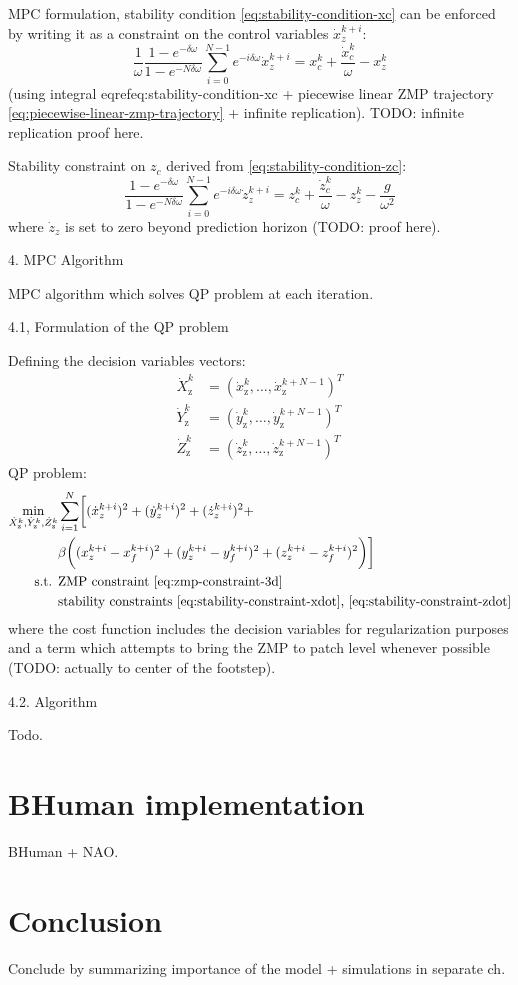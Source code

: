 MPC formulation, stability condition \eqref{eq:stability-condition-xc} can be 
enforced by writing it as a constraint on the control variables
$\dot{x}_z^{k+i}$:
\begin{equation}
  \label{eq:stability-constraint-xdot}
  \frac{1}{\omega}\frac{1-e^{-\delta\omega}}{1-e^{-N\delta\omega}}
    \sum_{i=0}^{N-1} e^{-i\delta\omega} \dot{x}_z^{k+i} =
    x_c^k + \frac{\dot{x}_c^k}{\omega} - x_z^k
\end{equation}
(using integral eqref{eq:stability-condition-xc} + piecewise linear ZMP trajectory
\eqref{eq:piecewise-linear-zmp-trajectory} + infinite replication). TODO:
infinite replication proof here.

Stability constraint on $z_c$ derived from \eqref{eq:stability-condition-zc}:
\begin{equation}
  \label{eq:stability-constraint-zdot}
  \frac{1-e^{-\delta\omega}}{1-e^{-N\delta\omega}}
    \sum_{i=0}^{N-1} e^{-i\delta\omega} \dot{z}_z^{k+i} =
    z_c^k + \frac{\dot{z}_c^k}{\omega} - z_z^k - \frac{g}{\omega^2}
\end{equation}
where $\dot{z}_z$ is set to zero beyond prediction horizon (TODO: proof here).

4. MPC Algorithm

MPC algorithm which solves QP problem at each iteration.

4.1, Formulation of the QP problem

Defining the decision variables vectors:
\begin{align}
  \dot{X}_\text{z}^k&=(\dot{x}_\text{z}^k, \dots, \dot{x}_\text{z}^{k+N-1})^T \\
  \dot{Y}_\text{z}^k&=(\dot{y}_\text{z}^k, \dots, \dot{y}_\text{z}^{k+N-1})^T \\
  \dot{Z}_\text{z}^k&=(\dot{z}_\text{z}^k, \dots, \dot{z}_\text{z}^{k+N-1})^T
\end{align}
QP problem:
\begin{align*}
  \min_{\dot{X}_\text{z}^k, \dot{Y}_\text{z}^k, \dot{Z}_\text{z}^k}
      &\sum_{i=1}^N
      \biggl[
          (\dot{x}_z^{k+i})^2 +
          (\dot{y}_z^{k+i})^2 +
          (\dot{z}_z^{k+i})^2 + \\
          &\beta \biggl(
              (x_z^{k+i} - x_f^{k+i})^2 +
              (y_z^{k+i} - y_f^{k+i})^2 +
              (z_z^{k+i} - z_f^{k+i})^2
          \biggr)
      \biggr]\\
      \textrm{s.t. } &\textrm{ZMP constraint \eqref{eq:zmp-constraint-3d}} \\
      &\textrm{stability constraints \eqref{eq:stability-constraint-xdot},
          \eqref{eq:stability-constraint-zdot}}
\end{align*}
where the cost function includes the decision variables for regularization 
purposes and a term which attempts to bring the ZMP to patch level whenever 
possible (TODO: actually to center of the footstep).

4.2. Algorithm

Todo.

\section{BHuman implementation}
BHuman + NAO.

\section{Conclusion}
Conclude by summarizing importance of the model + simulations in
separate ch.

